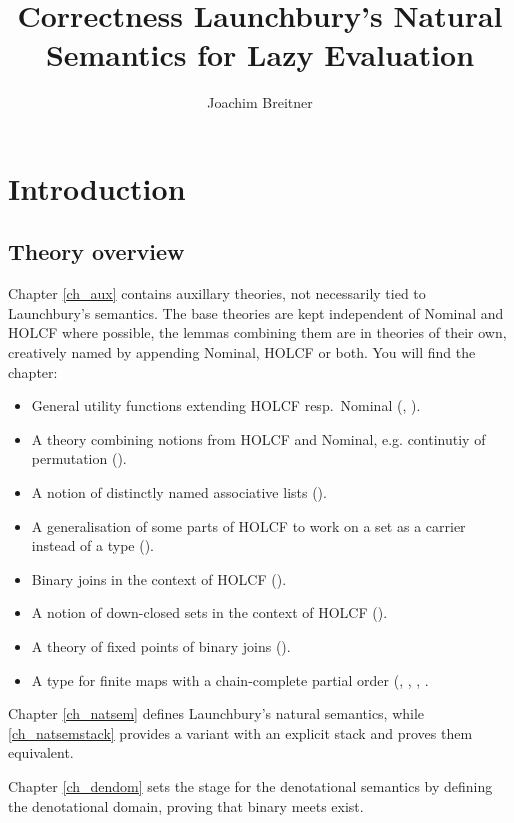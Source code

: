 \documentclass[11pt,a4paper,parskip=half]{scrbook}
\begin{document}
\title{Correctness Launchbury's Natural Semantics for Lazy Evaluation}
\author{Joachim Breitner}
\maketitle

\tableofcontents

\chapter{Introduction}

\section{Theory overview}

Chapter \ref{ch_aux} contains auxillary theories, not necessarily tied to Launchbury's semantics. The base theories are kept independent of Nominal and HOLCF where possible, the lemmas combining them are in theories of their own, creatively named by appending Nominal, HOLCF or both.  You will find the chapter:
\begin{itemize}
\item General utility functions extending HOLCF resp.\ Nominal (, ).
\item A theory combining notions from HOLCF and Nominal, e.g. continutiy of permutation ().
\item A notion of distinctly named associative lists (). 
\item A generalisation of some parts of HOLCF to work on a set as a carrier instead of a type ().
\item Binary joins in the context of HOLCF ().
\item A notion of down-closed sets in the context of HOLCF ().
\item A theory of fixed points of binary joins ().
\item A type for finite maps with a chain-complete partial order (, , , .
\end{itemize}

Chapter \ref{ch_natsem} defines Launchbury's natural semantics, while \ref{ch_natsemstack} provides a variant with an explicit stack and proves them equivalent.

Chapter \ref{ch_dendom} sets the stage for the denotational semantics by defining the denotational domain, proving that binary meets exist.
\end{document}
